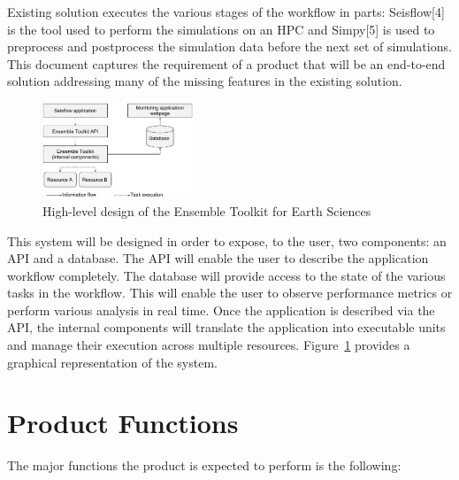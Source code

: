 \documentclass{scrreprt}
\begin{document}
Existing solution executes the various stages of the workflow in parts: Seisflow[4] is the tool used to perform the simulations on an HPC and Simpy[5] is used to preprocess and postprocess the simulation data before the next set of simulations. This document captures the requirement of a product that will be an end-to-end solution addressing many of the missing features in the existing solution.

\begin{figure}
\includegraphics[width=0.4\textwidth]{seisflow-sys-design.pdf}
\caption{High-level design of the Ensemble Toolkit for Earth Sciences}
\label{fig:seisflow_sys_design}
\end{figure}

This system will be designed in order to expose, to the user, two components: an API and a database. The API will enable the user to describe the application workflow completely. The database will provide access to the state of the various tasks in the workflow. This will enable the user to observe performance metrics or perform various analysis in real time.
Once the application is described via the API, the internal components will translate the application into executable units and manage their execution across multiple resources. Figure~\ref{fig:seisflow_sys_design} provides a graphical representation of the system.



\section{Product Functions}

The major functions the product is expected to perform is the following:
\end{document}
